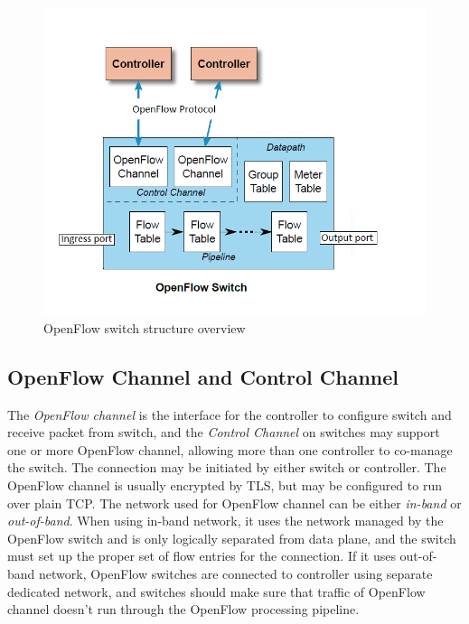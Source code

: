 \begin{figure}[H]
\begin{center} 
\includegraphics[width=1.1\textwidth]{figures/openflow_switch_overview.PNG}
\end{center}
\caption{OpenFlow switch structure overview}
\label{OF_OV}
\end{figure} 

\subsection{OpenFlow Channel and Control Channel}
\label{OpenFlow Channel and Control Channel}
The \textit{OpenFlow channel} is the interface for the controller to configure switch and receive packet from switch, and the \textit{Control Channel} on switches may support one or more OpenFlow channel, allowing more than one controller to co-manage the switch. The connection may be initiated by either switch or controller. The OpenFlow channel is usually encrypted by TLS, but may be configured to run over plain TCP. The network used for OpenFlow channel can be either \textit{in-band} or \textit{out-of-band}. When using in-band network, it uses the network managed by the OpenFlow switch and is only logically separated from data plane, and the switch must set up the proper set of flow entries for the connection. If it uses out-of-band network, OpenFlow switches are connected to controller using separate dedicated network, and switches should make sure that traffic of OpenFlow channel doesn't run through the OpenFlow processing pipeline. \cite{OF_SPEC}

